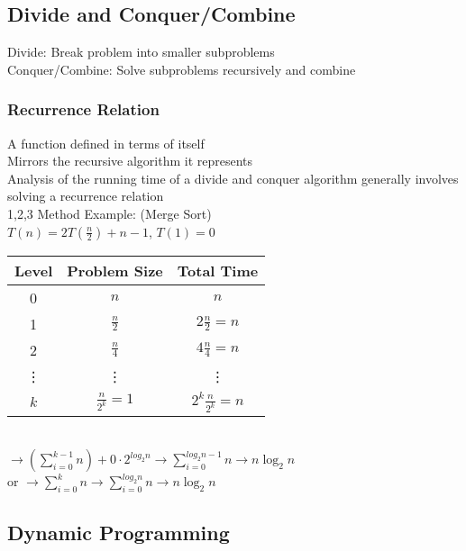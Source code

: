 \documentclass{article}
\begin{document}
\begin{multicols*}{2}
        \subsection*{Divide and Conquer/Combine}
        Divide: Break problem into smaller subproblems\\
        Conquer/Combine: Solve subproblems recursively and combine
        \subsubsection*{Recurrence Relation}
        A function defined in terms of itself\\
        Mirrors the recursive algorithm it represents\\
        Analysis of the running time of a divide and conquer algorithm generally involves
        solving a recurrence relation\\
        1,2,3 Method Example: (Merge Sort)\\
        $T(n) = 2T(\frac{n}{2}) + n-1$, $T(1) = 0$\\
        \begin{tabular}{c|c|c}
            Level  & Problem Size        & Total Time               \\
            \hline
            0      & $n$                 & $n$                      \\
            1      & $\frac{n}{2}$       & $2\frac{n}{2} = n$       \\
            2      & $\frac{n}{4}$       & $4\frac{n}{4} = n$       \\
            \vdots & \vdots              & \vdots                   \\
            $k$    & $\frac{n}{2^k} = 1$ & $2^{k}\frac{n}{2^k} = n$ \\
        \end{tabular}\\
        $\to (\sum\limits_{i=0}^{k-1} n) + 0 \cdot 2^{log_2 n} \to \sum\limits_{i=0}^{log_2 n -
        1} n \to n\log_2 n$\\
        or $\to \sum\limits_{i=0}^{k} n \to \sum\limits_{i=0}^{log_2 n} n \to n\log_2 n$
        \subsection*{Dynamic Programming}
    \end{multicols*}
\end{document}
